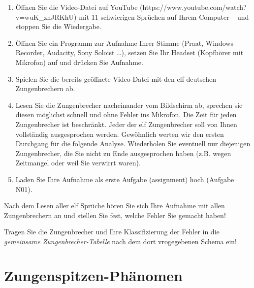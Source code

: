 \documentclass[
  letterpaper,
]{scrbook}
\providecommand{\tightlist}{%
  \setlength{\itemsep}{0pt}\setlength{\parskip}{0pt}}\usepackage{longtable,booktabs,array}
\begin{document}
\begin{enumerate}
\def\labelenumi{\arabic{enumi}.}
\tightlist
\item
  Öffnen Sie die Video-Datei auf YouTube
  (https://www.youtube.com/watch?v=wuK\_znJRKhU) mit 11 schwierigen
  Sprüchen auf Ihrem Computer -- und stoppen Sie die Wiedergabe.\\
\item
  Öffnen Sie ein Programm zur Aufnahme Ihrer Stimme (Praat, Windows
  Recorder, Audacity, Sony Soloist \ldots), setzen Sie Ihr Headset
  (Kopfhörer mit Mikrofon) auf und drücken Sie Aufnahme.\\
\item
  Spielen Sie die bereits geöffnete Video-Datei mit den elf deutschen
  Zungenbrechern ab.\\
\item
  Lesen Sie die Zungenbrecher nacheinander vom Bildschirm ab, sprechen
  sie diesen möglichst schnell und ohne Fehler ins Mikrofon. Die Zeit
  für jeden Zungenbrecher ist beschränkt. Jeder der elf Zungenbrecher
  soll von Ihnen vollständig ausgesprochen werden. Gewöhnlich werten wir
  den ersten Durchgang für die folgende Analyse. Wiederholen Sie
  eventuell nur diejenigen Zungenbrecher, die Sie nicht zu Ende
  ausgesprochen haben (z.B. wegen Zeitmangel oder weil Sie verwirrt
  waren).\\
\item
  Laden Sie Ihre Aufnahme als erste Aufgabe (assignment) hoch (Aufgabe
  N01).\\
\end{enumerate}

Nach dem Lesen aller elf Sprüche hören Sie sich Ihre Aufnahme mit allen
Zungenbrechern an und stellen Sie fest, welche Fehler Sie gemacht haben!

Tragen Sie die Zungenbrecher und Ihre Klassifizierung der Fehler in die
\emph{gemeinsame Zungenbrecher-Tabelle} nach dem dort vrogegebenen
Schema ein!

\hypertarget{sec-zungenspitze}{%
\chapter{Zungenspitzen-Phänomen}\label{sec-zungenspitze}}
\end{document}
